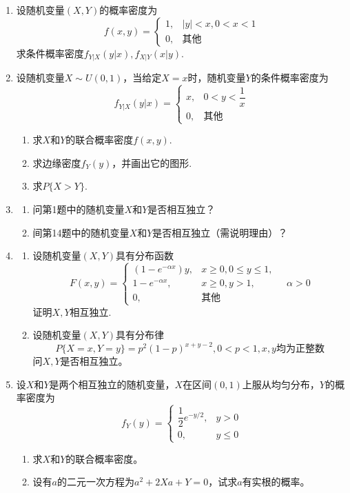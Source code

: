 \begin{enumerate}
     \item 设随机变量$(X,Y)$的概率密度为
     $$f(x,y)=\left\{\begin{array}{ll}
         1, & |y|<x,0<x<1\\
         0, & \mbox{其他}
     \end{array}\right.$$
     求条件概率密度$f_{Y|X}(y|x),f_{X|Y}(x|y)$.


     \item 设随机变量$X\sim U(0,1)$，当给定$X=x$时，随机变量$Y$的条件概率密度为
     $$f_{Y|X}(y|x)=\left\{\begin{array}{ll}
         x, & 0<y<\dfrac{1}{x} \\
         0, & \mbox{其他}
     \end{array}\right.$$
     \begin{enumerate}
         \item 求$X$和$Y$的联合概率密度$f(x,y)$.
         \item 求边缘密度$f_Y(y)$，并画出它的图形.
         \item 求$P\{X>Y\}$.
     \end{enumerate}


     \item \begin{enumerate}
         \item 问第1题中的随机变量$X$和$Y$是否相互独立？
         \item 间第14题中的随机变量$X$和$Y$是否相互独立（需说明理由）？
     \end{enumerate}


     \item \begin{enumerate}
         \item 设随机变量$(X,Y)$具有分布函数
         $$F(x,y)=\left\{\begin{array}{ll}
             (1-e^{-\alpha x})y, & x\geq 0,0\leq y \leq 1,\\
             1-e^{-\alpha x}, & x\geq 0,y>1,\\
             0, & \mbox{其他}
         \end{array}\right.\quad \alpha>0$$
         证明$X,Y$相互独立.
         \item 设随机变量$(X,Y)$具有分布律
         $$P\{X=x,Y=y\}=p^2(1-p)^{x+y-2},0<p<1,x,y\mbox{均为正整数}$$
         问$X,Y$是否相互独立。
     \end{enumerate}



     \item 设$X$和$Y$是两个相互独立的随机变量，$X$在区间$(0,1)$上服从均匀分布，$Y$的概率密度为
     $$f_Y(y)=\left\{\begin{array}{ll}
         \dfrac{1}{2} e^{-y/2}, & y>0\\
         0, & y\leq 0
     \end{array}\right.$$
     \begin{enumerate}
         \item 求$X$和$Y$的联合概率密度。
         \item 设有$a$的二元一次方程为$a^2+2Xa+Y=0$，试求$a$有实根的概率。
     \end{enumerate}




\end{enumerate}
